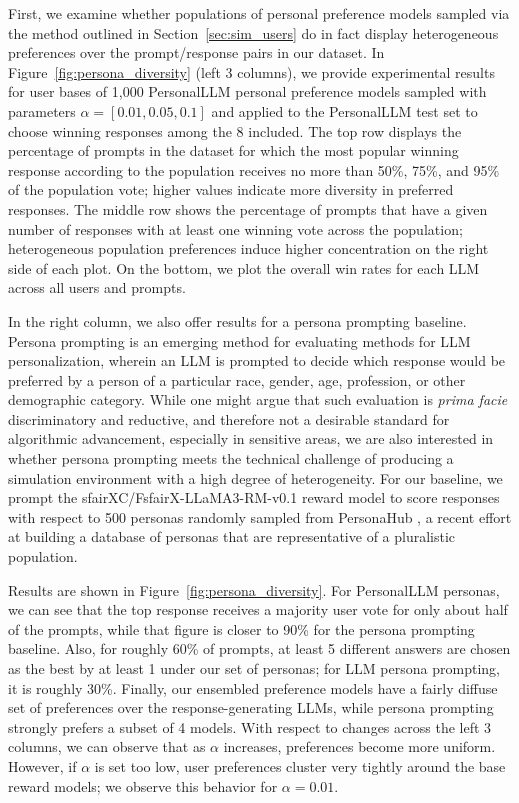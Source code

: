 First, we examine whether populations of personal preference models sampled via the method outlined in Section~\ref{sec:sim_users} do in fact display heterogeneous preferences over the prompt/response pairs in our dataset.
In Figure~\ref{fig:persona_diversity} (left 3 columns), we provide experimental results for user bases of 1,000 \textsf{PersonalLLM} personal preference models sampled with parameters $\alpha=[0.01, 0.05, 0.1]$ and applied to the \textsf{PersonalLLM} test set to choose winning responses among the 8 included.
The top row displays the percentage of prompts in the dataset for which the most popular winning response according to the population receives no more than 50\%, 75\%, and 95\% of the population vote; higher values indicate more diversity in preferred responses.  
The middle row shows the percentage of prompts that have a given number of responses with at least one winning vote across the population; heterogeneous population preferences induce higher concentration on the right side of each plot.
On the bottom, we plot the overall win rates for each LLM across all users and prompts.

In the right column, we also offer results for a persona prompting baseline.  
Persona prompting \citep{castricato2024personareproducibletestbedpluralistic, chan2024scalingsyntheticdatacreation, jang2023personalizedsoupspersonalizedlarge} is an emerging method for evaluating methods for LLM personalization, wherein an LLM is prompted to decide which response would be preferred by a person of a particular race, gender, age, profession, or other demographic category.  
While one might argue that such evaluation is \textit{prima facie} discriminatory and reductive, and therefore not a desirable standard for algorithmic advancement, especially in sensitive areas, we are also interested in whether persona prompting meets the technical challenge of producing a simulation environment with a high degree of heterogeneity.
For our baseline, we prompt the sfairXC/FsfairX-LLaMA3-RM-v0.1 reward model \citep{dong2023raft} to score responses with respect to 500 personas randomly sampled from PersonaHub \citet{chan2024scalingsyntheticdatacreation}, a recent effort at building a database of personas that are representative of a pluralistic population.

Results are shown in Figure~\ref{fig:persona_diversity}.
For \textsf{PersonalLLM} personas, we can see that the top response receives a majority user vote for only about half of the prompts, while that figure is closer to 90\% for the persona prompting baseline.  
Also, for roughly 60\% of prompts, at least 5 different answers are chosen as the best by at least 1 under our set of personas; for LLM persona prompting, it is roughly 30\%.  
Finally, our ensembled preference models have a fairly diffuse set of preferences over the response-generating LLMs, while persona prompting strongly prefers a subset of 4 models.
With respect to changes across the left 3 columns, we can observe that as $\alpha$ increases, preferences become more uniform.  
However, if $\alpha$ is set too low, user preferences cluster very tightly around the base reward models; we observe this behavior for $\alpha=0.01$.

